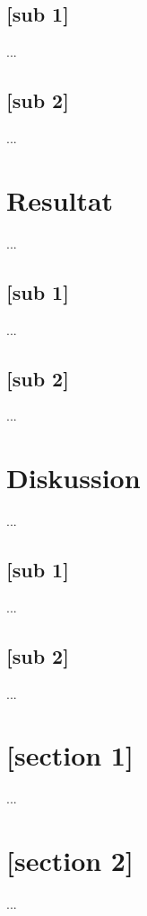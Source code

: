 \documentclass{article}
\begin{document}
\subsection{[sub 1]}\label{subsec:M_1}
...


\subsection{[sub 2]}\label{subsec:M_2}
...


\section{Resultat}\label{sec:Resultat}
...


\subsection{[sub 1]}\label{subsec:R_1}
...


\subsection{[sub 2]}\label{subsec:R_2}
...


\section{Diskussion}\label{sec:Diskussion}
...


\subsection{[sub 1]}\label{subsec:D_1}
...


\subsection{[sub 2]}\label{subsec:d_2}
...


\newpage
\printbibliography


\newpage
\appendix

\section{[section 1]}\label{app:a}
...


\section{[section 2]}\label{app:b}
...


\end{document}
